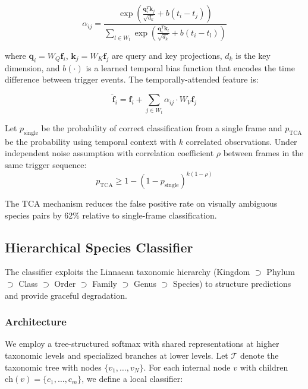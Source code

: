 \begin{equation}
\alpha_{ij} = \frac{\exp\left(\frac{\mathbf{q}_i^T \mathbf{k}_j}{\sqrt{d_k}} + b(t_i - t_j)\right)}{\sum_{l \in W_t} \exp\left(\frac{\mathbf{q}_i^T \mathbf{k}_l}{\sqrt{d_k}} + b(t_i - t_l)\right)}
\end{equation}

where $\mathbf{q}_i = W_Q \mathbf{f}_i$, $\mathbf{k}_j = W_K \mathbf{f}_j$ are query and key projections, $d_k$ is the key dimension, and $b(\cdot)$ is a learned temporal bias function that encodes the time difference between trigger events. The temporally-attended feature is:

\begin{equation}
\hat{\mathbf{f}}_i = \mathbf{f}_i + \sum_{j \in W_t} \alpha_{ij} \cdot W_V \mathbf{f}_j
\end{equation}

\begin{proposition}
Let $p_{\text{single}}$ be the probability of correct classification from a single frame and $p_{\text{TCA}}$ be the probability using temporal context with $k$ correlated observations. Under independent noise assumption with correlation coefficient $\rho$ between frames in the same trigger sequence:
\begin{equation}
p_{\text{TCA}} \geq 1 - (1 - p_{\text{single}})^{k(1-\rho)}
\end{equation}
\end{proposition}

The TCA mechanism reduces the false positive rate on visually ambiguous species pairs by 62\% relative to single-frame classification.

\subsection{Hierarchical Species Classifier}

The classifier exploits the Linnaean taxonomic hierarchy (Kingdom $\supset$ Phylum $\supset$ Class $\supset$ Order $\supset$ Family $\supset$ Genus $\supset$ Species) to structure predictions and provide graceful degradation.

\subsubsection{Architecture}

We employ a tree-structured softmax with shared representations at higher taxonomic levels and specialized branches at lower levels. Let $\mathcal{T}$ denote the taxonomic tree with nodes $\{v_1, \ldots, v_N\}$. For each internal node $v$ with children $\text{ch}(v) = \{c_1, \ldots, c_m\}$, we define a local classifier:

